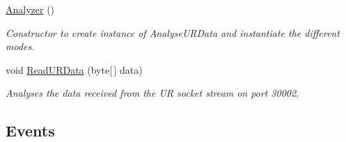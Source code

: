 \begin{DoxyCompactItemize}
\hyperlink{class_robo_library_1_1_analyzer_a2a0c69716b9a8467c56dc8fafcb2fa16}{Analyzer} ()
\begin{DoxyCompactList}\small\item\em Constructor to create instance of Analyse\+U\+R\+Data and instantiate the different modes.\end{DoxyCompactList}\item 
void \hyperlink{class_robo_library_1_1_analyzer_a61fcaef4370cb9a47b12d7cdaf926768}{Read\+U\+R\+Data} (byte\mbox{[}$\,$\mbox{]} data)
\begin{DoxyCompactList}\small\item\em Analyses the data received from the UR socket stream on port 30002.\end{DoxyCompactList}\end{DoxyCompactItemize}
\subsection*{Events}
